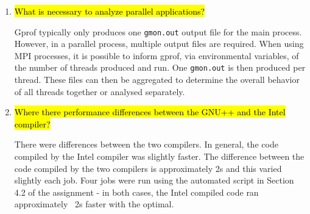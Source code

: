 \documentclass{article}
\begin{document}
\begin{enumerate}
	\item \hl{What is necessary to analyze parallel applications?}

	Gprof typically only produces one \verb!gmon.out! output file for the main process. However, in a parallel process, multiple output files are required. When using MPI processes, it is possible to inform gprof, via environmental variables, of the number of threads produced and run. One \verb!gmon.out! is then produced per thread. These files can then be aggregated to determine the overall behavior of all threads together or analysed separately.

	\item \hl{Where there performance differences between the GNU++ and the Intel compiler?}

	There were differences between the two compilers. In general, the code compiled by the Intel compiler was slightly faster. The difference between the code compiled by the two compilers is approximately 2s and this varied slightly each job. Four jobs were run using the automated script in Section 4.2 of the assignment - in both cases, the Intel compiled code ran approximately ~2s faster with the optimal.
\end{enumerate}
\end{document}
